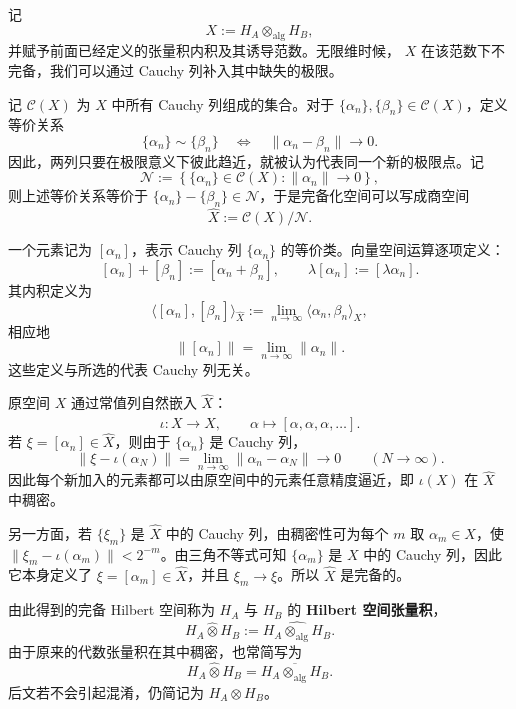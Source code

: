 \documentclass[UTF8,a4paper,11pt,openany]{ctexbook}
\begin{document}
\begin{definition}
记
\[
X:=H_A\otimes_{\mathrm{alg}}H_B,
\]
并赋予前面已经定义的张量积内积及其诱导范数。无限维时候， $X$ 在该范数下不完备，我们可以通过 Cauchy 列补入其中缺失的极限。

记 $\mathcal C(X)$ 为 $X$ 中所有 Cauchy 列组成的集合。对于
$\{\alpha_n\},\{\beta_n\}\in\mathcal C(X)$，定义等价关系
\begin{equation}
    \{\alpha_n\}\sim\{\beta_n\}
    \quad\Longleftrightarrow\quad
    \|\alpha_n-\beta_n\|\to0.
\end{equation}
因此，两列只要在极限意义下彼此趋近，就被认为代表同一个新的极限点。记
\[
\mathcal N
:=
\left\{
    \{\alpha_n\}\in\mathcal C(X):
    \|\alpha_n\|\to0
\right\},
\]
则上述等价关系等价于
$\{\alpha_n\}-\{\beta_n\}\in\mathcal N$，于是完备化空间可以写成商空间
\begin{equation}
    \widehat X
    :=
    \mathcal C(X)/\mathcal N.
\end{equation}

一个元素记为 $[\alpha_n]$，表示 Cauchy 列
$\{\alpha_n\}$ 的等价类。向量空间运算逐项定义：
\[
[\alpha_n]+[\beta_n]
:=
[\alpha_n+\beta_n],
\qquad
\lambda[\alpha_n]
:=
[\lambda\alpha_n].
\]
其内积定义为
\begin{equation}
    \bigl\langle[\alpha_n],[\beta_n]\bigr\rangle_{\widehat X}
    :=
    \lim_{n\to\infty}
    \langle\alpha_n,\beta_n\rangle_X,
\end{equation}
相应地
\[
\|[\alpha_n]\|
=
\lim_{n\to\infty}\|\alpha_n\|.
\]
这些定义与所选的代表 Cauchy 列无关。

原空间 $X$ 通过常值列自然嵌入 $\widehat X$：
\begin{equation}
    \iota:X\longrightarrow\widehat X,
    \qquad
    \alpha\longmapsto
    [\alpha,\alpha,\alpha,\ldots].
\end{equation}
若 $\xi=[\alpha_n]\in\widehat X$，则由于 $\{\alpha_n\}$ 是 Cauchy 列，
\begin{equation}
    \|\xi-\iota(\alpha_N)\|
    =
    \lim_{n\to\infty}
    \|\alpha_n-\alpha_N\|
    \longrightarrow0
    \qquad(N\to\infty).
\end{equation}
因此每个新加入的元素都可以由原空间中的元素任意精度逼近，即
$\iota(X)$ 在 $\widehat X$ 中稠密。

另一方面，若 $\{\xi_m\}$ 是 $\widehat X$ 中的 Cauchy 列，由稠密性可为每个 $m$ 取
$\alpha_m\in X$，使
$\|\xi_m-\iota(\alpha_m)\|<2^{-m}$。由三角不等式可知
$\{\alpha_m\}$ 是 $X$ 中的 Cauchy 列，因此它本身定义了
$\xi=[\alpha_m]\in\widehat X$，并且
$\xi_m\to\xi$。所以 $\widehat X$ 是完备的。

由此得到的完备 Hilbert 空间称为 $H_A$ 与 $H_B$ 的
\textbf{Hilbert 空间张量积}，
\begin{equation}
    H_A\widehat{\otimes}H_B
    :=
    \widehat{
        H_A\otimes_{\mathrm{alg}}H_B
    }.
\end{equation}
由于原来的代数张量积在其中稠密，也常简写为
\[
H_A\widehat{\otimes}H_B
=
\overline{
    H_A\otimes_{\mathrm{alg}}H_B
}.
\]
后文若不会引起混淆，仍简记为 $H_A\otimes H_B$。
\end{definition}
\end{document}
